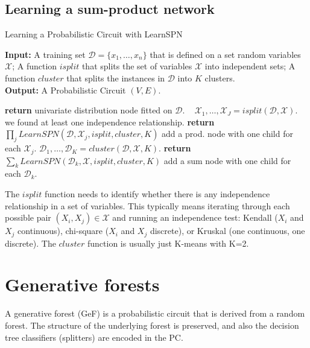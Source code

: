 \documentclass{article}
\newcommand{\var}[1]{\ensuremath{\textit{#1}}} %
\begin{document}
\subsection{Learning a sum-product network} \label{learnspn}

\begin{algorithm}[h]
\caption{Learning a Probabilistic Circuit with LearnSPN}
{\textbf{Input:} A training set $\mathcal{D} = \{ x_1, \ldots, x_n \}$ that is defined on a set random variables $\mathcal{X}$; A function $\var{isplit}$ that splits the set of variables $\mathcal{X}$ into independent sets; A function $\var{cluster}$ that splits the instances in $\mathcal{D}$ into $K$ clusters.} \\
{\textbf{Output:} A Probabilistic Circuit $(V, E)$. }
\label{alg:learnspn}
\begin{algorithmic}[1]
\Function{LearnSPN}{$\mathcal{D}, \mathcal{X}, \var{isplit}, \var{cluster}, \var{K}$}
 
    \State \textbf{return} univariate distribution node fitted on $\mathcal{D}$.
\
\Else
    \State $\mathcal{X}_1, \ldots, \mathcal{X}_J = isplit(\mathcal{D}, \mathcal{X})$.
    \If {$J$ > 1} \Comment we found at least one independence relationship. 
        \State \textbf{return} $\prod_j  \var{LearnSPN}(\mathcal{D}, \mathcal{X}_j, \var{isplit}, \var{cluster}, \var{K})$ \Comment add a prod. node with one child for each $\mathcal{X}_j$.
    \Else 
        \State $\mathcal{D}_1, \ldots, \mathcal{D}_K = cluster(\mathcal{D}, \mathcal{X}, K)$.
        \State \textbf{return} $\sum_k \var{LearnSPN}(\mathcal{D}_k, \mathcal{X}, \var{isplit}, \var{cluster}, \var{K})$ \Comment add a sum node with one child for each $\mathcal{D}_k$.
    \EndIf
\EndIf
\EndFunction
\end{algorithmic}
\end{algorithm}

The $isplit$ function needs to identify whether there is any independence relationship in a set of variables. This typically means iterating through each possible pair $(X_i, X_j) \in \mathcal{X}$ and running an independence test: Kendall ($X_i$ and $X_j$ continuous), chi-square ($X_i$ and $X_j$ discrete), or Kruskal (one continuous, one discrete). The $cluster$ function is usually just K-means with K=2.

\clearpage
\section{Generative forests} \label{sec:generative}
A generative forest (GeF) is a probabilistic circuit that is derived from a random forest. The structure of the underlying forest is preserved, and also the decision tree classifiers (splitters) are encoded in the PC.
\end{document}
